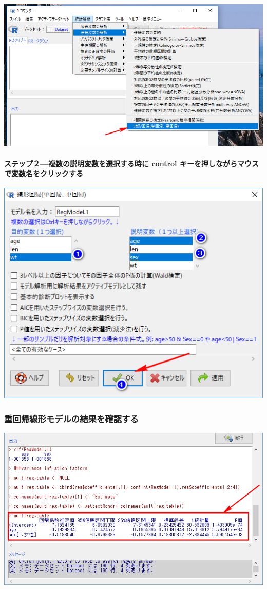 \documentclass[11pt,]{problemset}
\let\oldparagraph\paragraph
\renewcommand{\paragraph}[1]{\oldparagraph{#1}\mbox{}}
\begin{document}
\begin{center}\includegraphics[width=0.8\linewidth]{pic/lm00} \end{center}
\bigskip
\bigskip
\bigskip

\hypertarget{control-}{%
\paragraph{ステップ２---複数の説明変数を選択する時に control
キーを押しながらマウスで変数名をクリックする}\label{control-}}

\begin{center}\includegraphics[width=0.4\linewidth]{pic/lm04} \end{center}

\newpage
\vfill

\hypertarget{section-24}{%
\subsubsection{重回帰線形モデルの結果を確認する}\label{section-24}}

\begin{center}\includegraphics[width=0.8\linewidth]{pic/lm05} \end{center}
\end{document}
